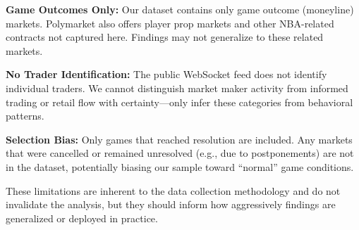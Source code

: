 \textbf{Game Outcomes Only:} Our dataset contains only game outcome (moneyline) markets. Polymarket also offers player prop markets and other NBA-related contracts not captured here. Findings may not generalize to these related markets.

\textbf{No Trader Identification:} The public WebSocket feed does not identify individual traders. We cannot distinguish market maker activity from informed trading or retail flow with certainty---only infer these categories from behavioral patterns.

\textbf{Selection Bias:} Only games that reached resolution are included. Any markets that were cancelled or remained unresolved (e.g., due to postponements) are not in the dataset, potentially biasing our sample toward ``normal'' game conditions.

These limitations are inherent to the data collection methodology and do not invalidate the analysis, but they should inform how aggressively findings are generalized or deployed in practice.

